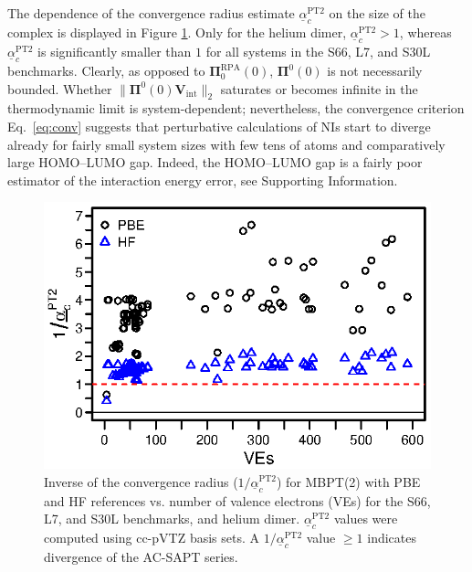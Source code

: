\documentclass[journal=jctcce,manuscript=article]{achemso}
\begin{document}
The dependence of the convergence radius estimate
$\underline{\alpha}_c^{\text{PT2}}$ on the size of the complex is displayed
in Figure \ref{fig:eig_q}. Only for the helium dimer,
$\underline{\alpha}_c^{\text{PT2}} > 1$, whereas
$\underline{\alpha}_c^{\text{PT2}}$ is significantly smaller than $1$
for all systems in the S66,\cite{doi:10.1021/ct2002946,doi:10.1021/ct200523a}
L7,\cite{doi:10.1021/ct400036b} and S30L\cite{Sure15JChemTheoryComput}
benchmarks. Clearly, as opposed to $\boldsymbol{\Pi}_0^{\text{RPA}}(0)$,
$\boldsymbol{\Pi}^0(0)$ is not necessarily bounded. Whether $\| \boldsymbol{\Pi}^0(0)
\mathbf{V}_{\text{int}} \|_2$ saturates or becomes infinite in the
thermodynamic limit is system-dependent;
nevertheless, the convergence criterion Eq.~\eqref{eq:conv} suggests that
perturbative calculations of NIs start to diverge already for
fairly small system sizes with few tens of atoms and comparatively large
HOMO--LUMO gap. Indeed, the HOMO--LUMO gap is a fairly poor estimator of
the interaction energy error, see Supporting Information. 

\begin{figure}[hbpt]
  \centering
  \includegraphics{eig_q.eps}
  \caption{Inverse of the convergence radius
    ($1/\underline{\alpha}_c^{\text{PT2}}$) for MBPT(2) with PBE and HF
    references vs. number of valence 
    electrons (VEs) for the
    S66,\cite{doi:10.1021/ct2002946,doi:10.1021/ct200523a} 
    L7,\cite{doi:10.1021/ct400036b} and S30L
    \cite{Sure15JChemTheoryComput} benchmarks, and helium dimer.
    $\underline{\alpha}_c^{\text{PT2}}$ values were computed using
    cc-pVTZ basis sets. A $1/\underline{\alpha}_c^{\text{PT2}}$ value
    $\ge 1$ indicates divergence of the AC-SAPT series.} 
  \label{fig:eig_q}
\end{figure}
\end{document}

